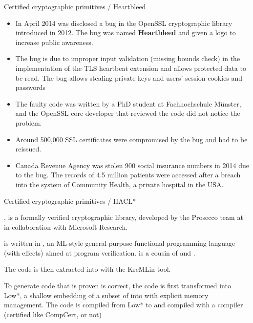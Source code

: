 \documentclass[compress,dvips,xcolor={dvipsnames},t]{beamer}
\begin{document}
%
\begin{frame}{Certified cryptographic primitives / Heartbleed}

  \begin{itemize}

    \item In April 2014 was disclosed a bug in the OpenSSL
      cryptographic library introduced in 2012. The bug was named
      \textbf{Heartbleed} and given a logo to increase public
      awareness.

    \item The bug is due to improper input validation (missing bounds
      check) in the implementation of the TLS heartbeat extension and
      allows protected data to be read.  The bug allows stealing
      private keys and users' session cookies and passwords

    \item The faulty code was written by a PhD student at
      Fachhochschule Münster, and the OpenSSL core developer that
      reviewed the code did not notice the problem.

    \item Around 500,000 SSL certificates were compromised by the bug
      and had to be reissued.

    \item Canada Revenue Agency was stolen 900 social insurance
      numbers in 2014 due to the bug. The records of 4.5 million
      patients were accessed after a breach into the system of
      Community Health, a private hospital in the USA.

  \end{itemize}

\end{frame}

%
\begin{frame}{Certified cryptographic primitives / HACL*}

  \HACLstar, is a formally verified cryptographic library, developed
  by the Prosecco team at \Inria in collaboration with Microsoft
  Research.

  \bigskip

  \HACLstar is written in \Fstar, an \textsf{ML}-style general-purpose
  functional programming language (with effects) aimed at program
  verification. \Fstar is a cousin of \OCaml and \Coq.

  \bigskip

  The \Fstar code is then extracted into \Clang with the
  \textsf{KreMLin} tool.

  \bigskip

  To generate \Clang code that is proven is correct, the \Fstar code
  is first transformed into \textsf{Low*}, a shallow embedding of a
  subset of \Clang into \Fstar with explicit memory management. The
  code is compiled from \textsf{Low*} to \Clang and compiled with a
  \Clang compiler (certified like CompCert, or not)

\end{frame}
\end{document}
